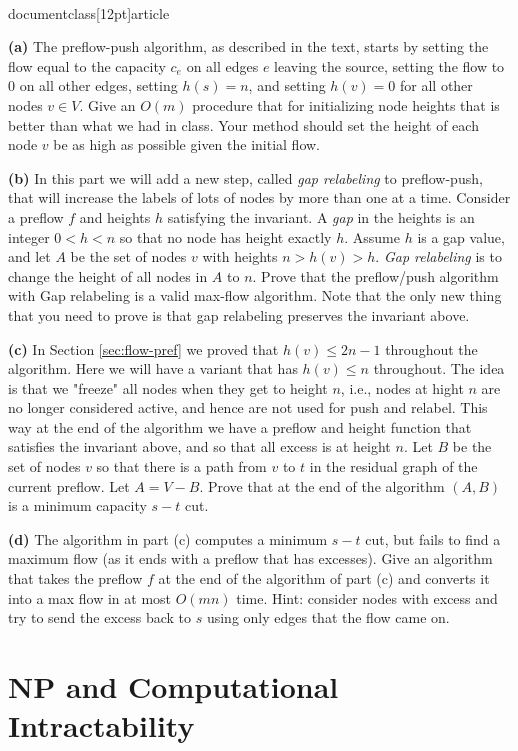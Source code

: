 \\documentclass[12pt]{article}
\def\setminus{{-}}
\begin{document}
\begin{enumerate}
\medskip
{\bf (a)}
The preflow-push algorithm, as described in the text, starts by
setting the flow equal to the capacity $c_e$ 
on all edges $e$ leaving the source, setting the flow
to 0 on all other edges, setting $h(s)=n$, and setting $h(v)=0$ for all
other nodes $v \in V$. Give an $O(m)$ procedure that for initializing node
heights that is better than what we had in class. Your method should
set the height of each node $v$ be as high as possible given the initial
flow.

\medskip
{\bf (b)} In this part we will add a new step, called {\em gap relabeling}
to preflow-push, that will increase the labels of lots of nodes by more than
one at a time. Consider a preflow $f$ and heights $h$ satisfying the
invariant. A {\em gap} in the heights is an integer $0 < h< n$ so that no node
has height exactly $h$. Assume $h$ is a gap value, and let $A$ be the set of
nodes $v$ with heights $n > h(v) > h$. {\em Gap relabeling} is to change the
height of all nodes in $A$ to $n$. Prove that the preflow/push algorithm with
Gap relabeling is a valid max-flow algorithm. Note that the only new thing
that you need to prove is that gap relabeling preserves the invariant above.

\medskip
{\bf (c)} In Section \ref{sec:flow-pref} we proved that $h(v) \le 2n -1$ 
throughout the algorithm.  Here we will have a variant that has $h(v) \le n$ 
throughout. The idea is that we "freeze" all nodes when they get to height 
$n$, i.e., nodes at hight
$n$ are no longer considered active, and hence are not used for push and
relabel. This way at the end of the algorithm we have a preflow and height
function that satisfies the invariant above, and so that all excess is at
height $n$. Let $B$ be the set of nodes $v$ so that there is a path from
$v$ to $t$ in the residual graph of the current preflow. Let
$A=V \setminus B$. Prove that at the end of the algorithm $(A,B)$ is a minimum
capacity $s-t$ cut.

\medskip
{\bf (d)} The algorithm in part (c) computes a minimum $s-t$ cut, but fails to 
find a maximum flow (as it ends with a preflow that has excesses). Give an 
algorithm that takes the preflow $f$ at the end of the algorithm of part (c) 
and converts it into a max flow in at most $O(mn)$ time. Hint: consider nodes 
with excess and try to send the excess back to $s$ using only edges that the 
flow came on.


\end{enumerate}

\section{NP and Computational Intractability}
\end{document}
